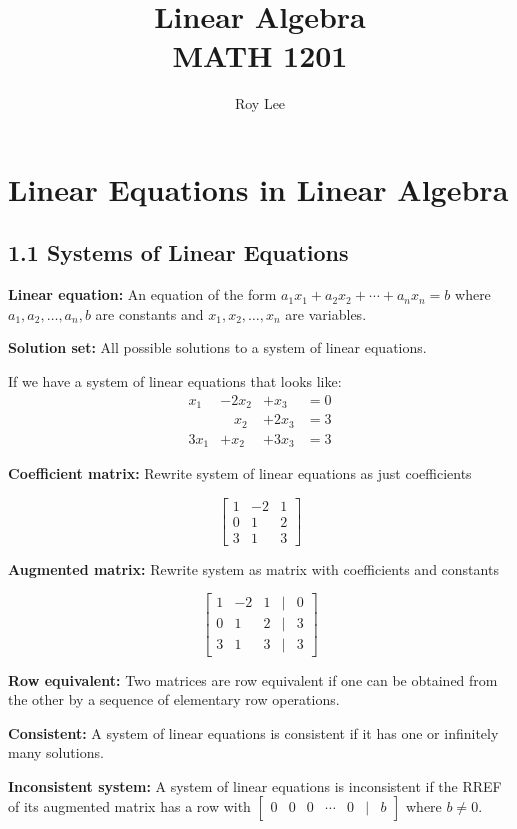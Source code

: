 \documentclass[12pt]{article}
\title{Linear Algebra \\ MATH 1201}
\author{Roy Lee}
\date{}  %
\newcommand{\definition}[2]{
  \noindent\textbf{#1:} #2
}
\begin{document}
\maketitle

\section{Linear Equations in Linear Algebra}

\subsection*{1.1 Systems of Linear Equations}

\definition{Linear equation}{An equation of the form $a_1x_1 + a_2x_2 + \cdots + a_nx_n = b$ where $a_1, a_2, \ldots, a_n, b$ are constants and $x_1, x_2, \ldots, x_n$ are variables.}

\definition{Solution set}{All possible solutions to a system of linear equations.}


If we have a system of linear equations that looks like:
\[
\begin{aligned}
    x_1 & - 2x_2 & + x_3 & = 0 \\
        & \phantom{x_1}x_2 & + 2x_3 & = 3 \\
    3x_1 & + x_2 & + 3x_3 & = 3
\end{aligned}
\]

\definition{Coefficient matrix}{Rewrite system of linear equations as just coefficients}
\[
\begin{bmatrix}
    1 & -2 & 1 \\
    0 & 1 & 2 \\
    3 & 1 & 3
\end{bmatrix}
\]

\definition {Augmented matrix}{Rewrite system as matrix with coefficients and constants}
\[
\begin{bmatrix}
    1 & -2 & 1 & \vert & 0 \\
    0 & 1 & 2 & \vert & 3 \\
    3 & 1 & 3 & \vert & 3
\end{bmatrix}
\]


\definition{Row equivalent}{Two matrices are row equivalent if one can be obtained from the other by a sequence of elementary row operations.}

\definition{Consistent}{A system of linear equations is consistent if it has one or infinitely many solutions.}

\begin{keyconceptbox}
    \textbf{Inconsistent system:}
    A system of linear equations is inconsistent if the RREF of its augmented matrix has a row with $\begin{bmatrix}0 & 0 & 0 & \cdots & 0 & \vert &  b \end{bmatrix}$ where $b \neq 0$.
\end{keyconceptbox}
\end{document}
